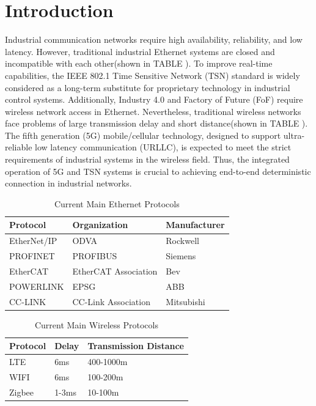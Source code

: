 \documentclass[english]{cccconf}
\begin{document}
\section{Introduction}
Industrial communication networks require high availability, reliability, and low latency. However, traditional industrial Ethernet systems are closed and incompatible with each other(shown in TABLE \uppercase\expandafter{}). To improve real-time capabilities, the IEEE 802.1 Time Sensitive Network (TSN) standard is widely considered as a long-term substitute for proprietary technology in industrial control systems. Additionally, Industry 4.0 and Factory of Future (FoF) require wireless network access in Ethernet. Nevertheless, traditional wireless networks face problems of large transmission delay and short distance\cite{2013Recommendations}(shown in TABLE \uppercase\expandafter{}). The fifth generation (5G) mobile/cellular technology, designed to support ultra-reliable low latency communication (URLLC), is expected to meet the strict requirements of industrial systems in the wireless field. Thus, the integrated operation of 5G and TSN systems is crucial to achieving end-to-end deterministic connection in industrial networks.
\begin{table}[!htb]
	\centering
	\caption{Current Main Ethernet Protocols}
	\label{tab1}
	\begin{tabular}{l|l|l}
			\hline
\textbf{Protocol}& \textbf{Organization}& \textbf{Manufacturer} \\
\hline
EtherNet/IP
& ODVA
& Rockwell \\
\hline
PROFINET
& PROFIBUS
& Siemens \\
\hline
EtherCAT
& EtherCAT Association
& Bev \\
\hline
POWERLINK
& EPSG
& ABB \\
\hline
CC-LINK
& CC-Link Association
& Mitsubishi \\
\hline
	\end{tabular}
\end{table}
\begin{table}[!htb]
	\centering
	\caption{Current Main Wireless Protocols}
	\label{tab1}
	\begin{tabular}{l|l|l}
\hline
\textbf{Protocol}& \textbf{Delay}& \textbf{Transmission Distance} \\
\hline
LTE
& 6ms
& 400-1000m \\
\hline
WIFI
& 6ms
& 100-200m \\
\hline
Zigbee
& 1-3ms
& 10-100m \\
\hline		
	\end{tabular}
\end{table}
\end{document}

